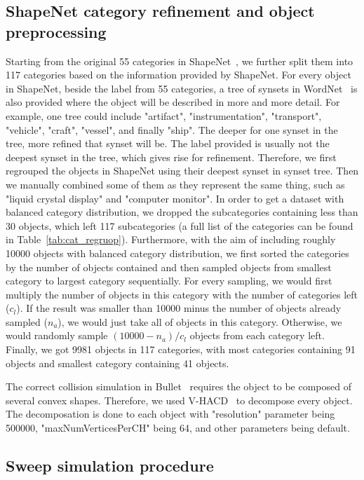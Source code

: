 \subsection{ShapeNet category refinement and object preprocessing}

Starting from the original 55 categories in ShapeNet~\cite{Chang2015}, we further split them into 117 categories based on the information provided by ShapeNet.
For every object in ShapeNet, beside the label from 55 categories, a tree of synsets in WordNet~\cite{miller1995wordnet} is also provided where the object will be described in more and more detail.
For example, one tree could include "artifact", "instrumentation", "transport", "vehicle", "craft", "vessel", and finally "ship".
The deeper for one synset in the tree, more refined that synset will be.
The label provided is usually not the deepest synset in the tree, which gives rise for refinement.
Therefore, we first regrouped the objects in ShapeNet using their deepest synset in synset tree.
Then we manually combined some of them as they represent the same thing, such as "liquid crystal display" and "computer monitor".
In order to get a dataset with balanced category distribution, we dropped the subcategories containing less than 30 objects, which left 117 subcategories (a full list of the categories can be found in Table~\ref{tab:cat_regruop}).
Furthermore, with the aim of including roughly 10000 objects with balanced category distribution, we first sorted the categories by the number of objects contained and then sampled objects from smallest category to largest category sequentially.
For every sampling, we would first multiply the number of objects in this category with the number of categories left ($c_l$).
If the result was smaller than 10000 minus the number of objects already sampled ($n_a$), we would just take all of objects in this category.
Otherwise, we would randomly sample $(10000 - n_a)/c_l$ objects from each category left.
Finally, we got 9981 objects in 117 categories, with most categories containing 91 objects and smallest category containing 41 objects.

The correct collision simulation in Bullet~\cite{wiki:bullet} requires the object to be composed of several convex shapes.
Therefore, we used V-HACD~\cite{mamou2009simple} to decompose every object.
The decomposation is done to each object with "resolution" parameter being 500000, "maxNumVerticesPerCH" being 64, and other parameters being default.

\subsection{Sweep simulation procedure}

